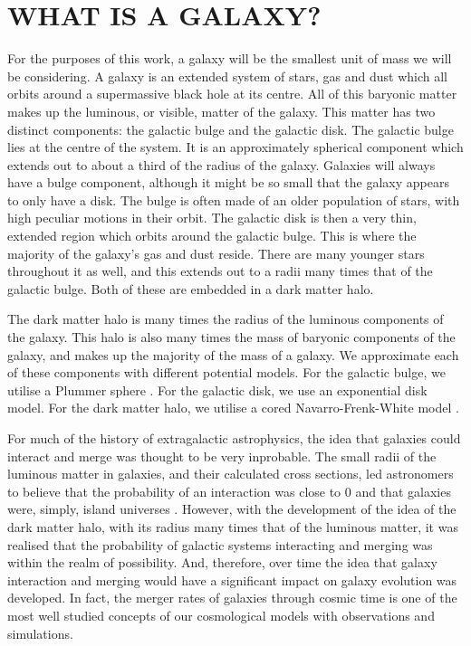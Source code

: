 \section{WHAT IS A GALAXY?}
\noindent For the purposes of this work, a galaxy will be the smallest unit of mass we will be considering. A galaxy is an extended system of stars, gas and dust which all orbits around a supermassive black hole at its centre. All of this baryonic matter makes up the luminous, or visible, matter of the galaxy. This matter has two distinct components: the galactic bulge and the galactic disk. The galactic bulge lies at the centre of the system. It is an approximately spherical component which extends out to about a third of the radius of the galaxy. Galaxies will always have a bulge component, although it might be so small that the galaxy appears to only have a disk. The bulge is often made of an older population of stars, with high peculiar motions in their orbit. The galactic disk is then a very thin, extended region which orbits around the galactic bulge. This is where the majority of the galaxy's gas and dust reside. There are many younger stars throughout it as well, and this extends out to a radii many times that of the galactic bulge. Both of these are embedded in a dark matter halo.

The dark matter halo is many times the radius of the luminous components of the galaxy. This halo is also many times the mass of baryonic components of the galaxy, and makes up the majority of the mass of a galaxy. We approximate each of these components with different potential models. For the galactic bulge, we utilise a Plummer sphere \citep{1911MNRAS..71..460P}. For the galactic disk, we use an exponential disk model. For the dark matter halo, we utilise a cored Navarro-Frenk-White model \citep{1997ApJ...490..493N}.

For much of the history of extragalactic astrophysics, the idea that galaxies could interact and merge was thought to be very inprobable. The small radii of the luminous matter in galaxies, and their calculated cross sections, led astronomers to believe that the probability of an interaction was close to 0 and that galaxies were, simply, island universes  \citep{1926ApJ....64..321H}. However, with the development of the idea of the dark matter halo, with its radius many times that of the luminous matter, it was realised that the probability of galactic systems interacting and merging was within the realm of possibility. And, therefore, over time the idea that galaxy interaction and merging would have a significant impact on galaxy evolution was developed. In fact, the merger rates of galaxies through cosmic time is one of the most well studied concepts of our cosmological models with observations and simulations.

